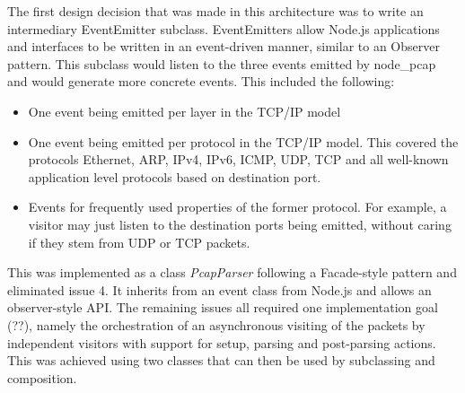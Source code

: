 The first design decision that was made in this architecture was to write an intermediary EventEmitter subclass. EventEmitters allow Node.js applications and interfaces to be written in an event-driven manner, similar to an Observer pattern. This subclass would listen to the three events emitted by node\_pcap and would generate more concrete events. This included the following:
\begin{itemize}
    \item One event being emitted per layer in the TCP/IP model
    \item One event being emitted per protocol in the TCP/IP model. This covered the protocols Ethernet, ARP, IPv4, IPv6, ICMP, UDP, TCP and all well-known application level protocols based on destination port.
    \item Events for frequently used properties of the former protocol. For example, a visitor may just listen to the destination ports being emitted, without caring if they stem from UDP or TCP packets.
\end{itemize}{}
This was implemented as a class \textit{PcapParser} following a Facade-style pattern and eliminated issue 4. It inherits from an event class from Node.js and allows an observer-style API. The remaining issues all required one implementation goal (??), namely the orchestration of an asynchronous visiting of the packets by independent visitors with support for setup, parsing and post-parsing actions. This was achieved using two classes that can then be used by subclassing and composition.


